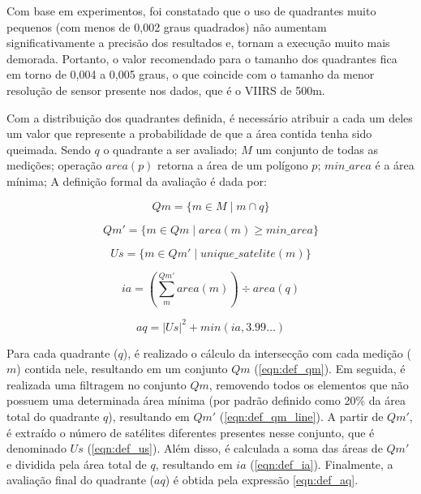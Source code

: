 \documentclass[cic,tc]{iiufrgs}
\begin{document}
Com base em experimentos, foi constatado que o uso de quadrantes muito pequenos (com menos de 0,002 graus quadrados) não aumentam significativamente a precisão dos resultados e, tornam a execução muito mais demorada. Portanto, o valor recomendado para o tamanho dos quadrantes fica em torno de 0,004 a 0,005 graus, o que coincide com o tamanho da menor resolução de sensor presente nos dados, que é o VIIRS de 500m. \par

Com a distribuição dos quadrantes definida, é necessário atribuir a cada um deles um valor que represente a probabilidade de que a área contida tenha sido queimada. Sendo $q$ o quadrante a ser avaliado; $M$ um conjunto de todas as medições; operação $area(p)$ retorna a área de um polígono $p$; $min\_area$ é a área mínima; A definição formal da avaliação é dada por: \par

\begin{equation} \label{eqn:def_qm}
Qm = \{ m \in M \mid m \cap q \}
\end{equation}

\begin{equation} \label{eqn:def_qm_line}
Qm' = \{ m \in Qm \mid area(m) \ge min\_area \}
\end{equation}

\begin{equation} \label{eqn:def_us}
Us = \{ m \in Qm' \mid unique\_satelite(m) \}
\end{equation}

\begin{equation} \label{eqn:def_ia}
ia = \left(\sum_{m}^{Qm'} area(m)\right) \div area(q)
\end{equation}

\begin{equation} \label{eqn:def_aq}
aq = |Us|^2 + min\left(ia, 3.99\ldots \right)
\end{equation}

Para cada quadrante ($q$), é realizado o cálculo da intersecção com cada medição ($m$) contida nele, resultando em um conjunto $Qm$ (\ref{eqn:def_qm}). Em seguida, é realizada uma filtragem no conjunto $Qm$, removendo todos os elementos que não possuem uma determinada área mínima (por padrão definido como 20\% da área total do quadrante $q$), resultando em $Qm'$ (\ref{eqn:def_qm_line}). A partir de $Qm'$, é extraído o número de satélites diferentes presentes nesse conjunto, que é denominado $Us$ (\ref{eqn:def_us}). Além disso, é calculada a soma das áreas de $Qm'$ e dividida pela área total de $q$, resultando em $ia$ (\ref{eqn:def_ia}). Finalmente, a avaliação final do quadrante ($aq$) é obtida pela expressão \ref{eqn:def_aq}. \par
\end{document}
